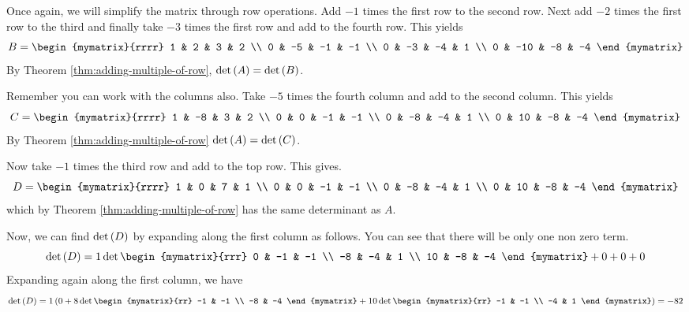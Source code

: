 \begin{solution} 
Once again, we will simplify the matrix through row operations. 
Add $-1$ times the first row to
the second row. Next add $-2$ times the first row to the third and finally take
$-3$ times the first row and add to the fourth row. This yields
\begin{equation*}
B = \begin{mymatrix}{rrrr}
1 & 2 & 3 & 2 \\
0 & -5 & -1 & -1 \\
0 & -3 & -4 & 1 \\
0 & -10 & -8 & -4
\end{mymatrix} 
\end{equation*}
By Theorem \ref{thm:adding-multiple-of-row}, $\det \left(A\right) = \det \left(B\right)$. 

Remember you can work with the columns also. Take $-5$
times the fourth column and add to the second column. This yields
\begin{equation*}
C = \begin{mymatrix}{rrrr}
1 & -8 & 3 & 2 \\
0 & 0 & -1 & -1 \\
0 & -8 & -4 & 1 \\
0 & 10 & -8 & -4
\end{mymatrix}
\end{equation*}
By Theorem \ref{thm:adding-multiple-of-row} $\det \left(A\right) = \det \left(C\right)$. 

Now take $-1$ times the third row and add to
the top row. This gives.
\begin{equation*}
D = \begin{mymatrix}{rrrr}
1 & 0 & 7 & 1 \\
0 & 0 & -1 & -1 \\
0 & -8 & -4 & 1 \\
0 & 10 & -8 & -4
\end{mymatrix}
\end{equation*}
which by Theorem \ref{thm:adding-multiple-of-row} has the same determinant as $A$.

Now, we can find $\det \left(D\right)$ by expanding along the first column as follows. You can see that there will be only one non zero term.
\begin{equation*}
\det \tup{D} = 1 \det \begin{mymatrix}{rrr}
0 & -1 & -1 \\
-8 & -4 & 1 \\
10 & -8 & -4
\end{mymatrix}
+ 0 + 0 + 0 
\end{equation*}
Expanding again along the first column, we have
\begin{equation*}
\det \tup{D} 
=
1 \tup{0 +  8\det \begin{mymatrix}{rr}
-1 & -1 \\
-8 & -4
\end{mymatrix} +10\det \begin{mymatrix}{rr}
-1 & -1 \\
-4 & 1
\end{mymatrix} } = -82
\end{equation*}


\end{solution}

